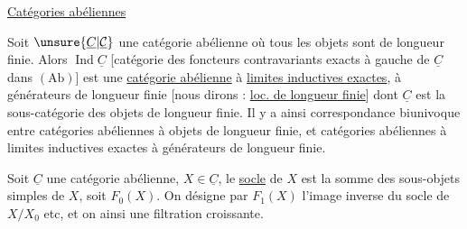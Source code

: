\uline{Catégories abéliennes}

Soit $\unsure{\underline{C}|\underline{\mathcal{C}}}$ une catégorie abélienne où tous les objets sont de longueur finie. Alors $\operatorname{Ind}\underline{C}$ [catégorie des foncteurs contravariants exacts à gauche de $\underline{C}$ dans  $(\mathrm{Ab})$] est une \uline{catégorie abélienne} à \uline{limites inductives exactes}, à générateurs de longueur finie [nous dirons : \uline{loc. de longueur finie}] dont $\underline{C}$ est la sous-catégorie des objets de longueur finie. Il y a ainsi  correspondance biunivoque entre catégories abéliennes à objets de longueur finie, et catégories abéliennes à limites inductives exactes à générateurs de longueur finie.

Soit $\underline{C}$ une catégorie abélienne, $X\in\underline{C}$, le \uline{socle} de $X$ est la  somme des sous-objets simples de $X$, soit $F_0(X)$. On désigne par $F_1(X)$ l'image inverse du socle de $X/X_0$ etc, et on  ainsi une filtration croissante. 
